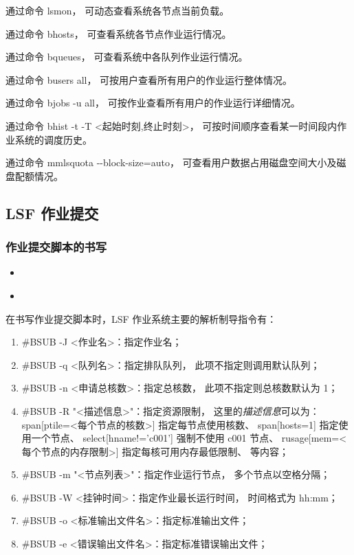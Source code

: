 \documentclass[UTF8]{ctexart}
\newcommand{\mynnote}[1]{\colorbox{gray!15}{\color{blue!65}#1}}
\newcommand{\insertbash}[2]{\begin{itemize}\item[]\end{itemize}}
\begin{document}
通过命令 \mynnote{lsmon}，
可动态查看系统各节点当前负载。

通过命令 \mynnote{bhosts}，
可查看系统各节点作业运行情况。

通过命令 \mynnote{bqueues}，
可查看系统中各队列作业运行情况。

通过命令 \mynnote{busers all}，
可按用户查看所有用户的作业运行整体情况。

通过命令 \mynnote{bjobs -u all}，
可按作业查看所有用户的作业运行详细情况。

通过命令 \mynnote{bhist -t -T <起始时刻,终止时刻>}，
可按时间顺序查看某一时间段内作业系统的调度历史。

通过命令 \mynnote{mmlsquota -{}-block-size=auto}，
可查看用户数据占用磁盘空间大小及磁盘配额情况。

\subsection{LSF 作业提交}
\subsubsection{作业提交脚本的书写}
\insertbash{material/mpi.lsf}{MPI 并行作业提交脚本示例}
\insertbash{material/openmp.lsf}{OpenMP 并行作业提交脚本示例}

在书写作业提交脚本时，LSF 作业系统主要的解析制导指令有：
\begin{enumerate}[\hspace{15mm}（1）]
  \item \mynnote{\#BSUB -J <作业名>}：指定作业名；
  \item \mynnote{\#BSUB -q <队列名>}：指定排队队列，
    此项不指定则调用默认队列；
  \item \mynnote{\#BSUB -n <申请总核数>}：指定总核数，
    此项不指定则总核数默认为 1；
  \item \mynnote{\#BSUB -R "<描述信息>"}：指定资源限制，
    这里的{\em 描述信息}可以为：\newline
    \mynnote{span[ptile=<每个节点的核数>]} 指定每节点使用核数、\newline
    \mynnote{span[hosts=1]} 指定使用一个节点、\newline
    \mynnote{select[hname!='c001']} 强制不使用 c001 节点、\newline
    \mynnote{rusage[mem=<每个节点的内存限制>]} 指定每核可用内存最低限制、\newline
    等内容；
  \item \mynnote{\#BSUB -m "<节点列表>"}：指定作业运行节点，
    多个节点以空格分隔；
  \item \mynnote{\#BSUB -W <挂钟时间>}：指定作业最长运行时间，
    时间格式为 hh:mm；
  \item \mynnote{\#BSUB -o <标准输出文件名>}：指定标准输出文件；
  \item \mynnote{\#BSUB -e <错误输出文件名>}：指定标准错误输出文件；
\end{enumerate}
\end{document}
